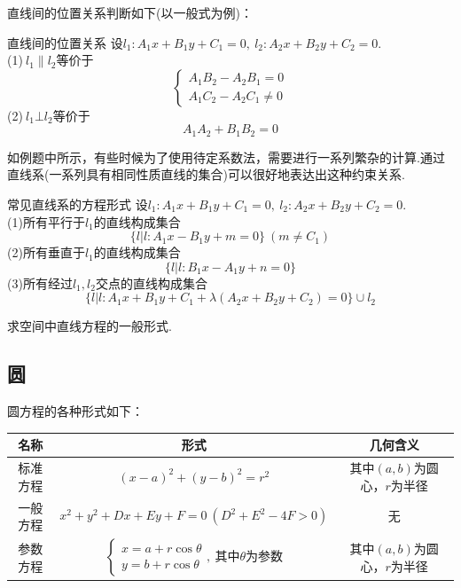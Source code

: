 \documentclass[lang=cn, zihao=4.5]{elegantbook}
\begin{document}
直线间的位置关系判断如下(以一般式为例)：

\begin{proposition}{直线间的位置关系}
	设$l_1:A_1x+B_1y+C_1=0,~l_2:A_2x+B_2y+C_2=0$. \\
	(1)$~l_1 \parallel l_2$等价于$$\begin{cases}
		A_1B_2-A_2B_1=0 \\
		A_1C_2-A_2C_1 \neq 0
	\end{cases}$$
	(2)$~l_1 \bot l_2$等价于$$A_1A_2+B_1B_2=0$$
\end{proposition}

如例题中所示，有些时候为了使用待定系数法，需要进行一系列繁杂的计算.通过直线系(一系列具有相同性质直线的集合)可以很好地表达出这种约束关系.

\begin{proposition}{常见直线系的方程形式}
	设$l_1:A_1x+B_1y+C_1=0,~l_2:A_2x+B_2y+C_2=0$. \\
	(1)所有平行于$l_1$的直线构成集合$$\{ l|l:A_1x-B_1y+m=0 \}~(m \neq C_1)$$
	(2)所有垂直于$l_1$的直线构成集合$$\{ l|l:B_1x-A_1y+n=0 \}$$
	(3)所有经过$l_1,l_2$交点的直线构成集合$$\{ l|l:A_1x+B_1y+C_1+\lambda (A_2x+B_2y+C_2)=0 \} \cup l_2$$
\end{proposition}

\begin{problem}
	求空间中直线方程的一般形式.
\end{problem}

\subsection{圆}

圆方程的各种形式如下：

\begin{table}[h]
	\centering
	\renewcommand\arraystretch{1.5}
	\begin{tabular}{ccc}
		\toprule
		名称&形式&几何含义 \\
		\midrule
		标准方程 & $(x-a)^2+(y-b)^2=r^2$ & 其中$(a,b)$为圆心，$r$为半径 \\
		一般方程 & $x^2+y^2+Dx+Ey+F=0~(D^2+E^2-4F>0)$ & 无 \\
		参数方程 & $\begin{cases}
			x=a+r\cos \theta \\
			y=b+r\cos \theta
		\end{cases}, ~\textit{其中}\theta \textit{为参数}$ & 其中$(a,b)$为圆心，$r$为半径 \\
		\bottomrule
	\end{tabular}
\end{table}
\end{document}
